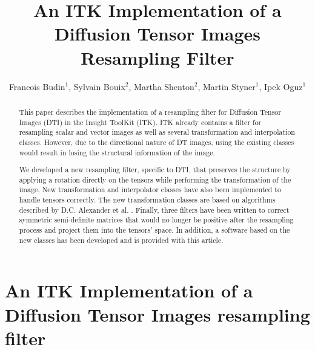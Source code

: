 \documentclass{InsightArticle}
\title{An ITK Implementation of a Diffusion Tensor Images Resampling Filter}
\author{Francois Budin$^{1}$, Sylvain Bouix$^{2}$, Martha Shenton$^{2}$, Martin Styner$^{1}$, Ipek Oguz$^{1}$}
\newcommand{\IJhandlerIDnumber}{3189}
\begin{document}
%
% 
\IJhandlefooter{\IJhandlerIDnumber}


\ifpdf
\else
\fi


\maketitle


\ifhtml
\chapter*{An ITK Implementation of a Diffusion Tensor Images resampling filter\label{front}}
\fi


\begin{abstract}
\noindent
This paper describes the implementation of a resampling filter for Diffusion Tensor Images (DTI) in the Insight ToolKit (ITK). ITK already contains a filter for resampling scalar and vector images as well as several transformation and interpolation classes. However, due to the directional nature of DT images, using the existing classes would result in losing the structural information of the image.

We developed a new resampling filter, specific to DTI, that preserves the structure by applying a rotation directly on the tensors while performing the transformation of the image. New transformation and interpolator classes have also been implemented to handle tensors correctly. The new transformation classes are based on algorithms described by D.C. Alexander et al. \cite{Alexander2001}. Finally, three filters have been written to correct symmetric semi-definite matrices that would no longer be positive after the resampling process and project them into the tensors' space. In addition, a software based on the new classes has been developed and is provided with this article.
\end{abstract}
\end{document}
